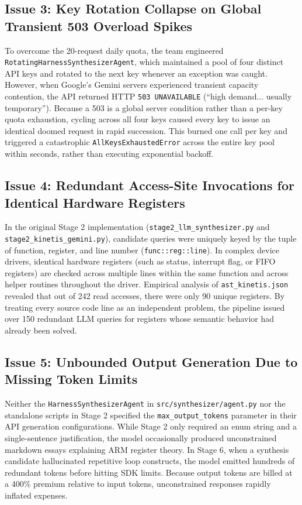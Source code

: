 \documentclass[11pt,a4paper]{article}
\begin{document}
\subsection{Issue 3: Key Rotation Collapse on Global Transient 503 Overload Spikes}
To overcome the 20-request daily quota, the team engineered \texttt{RotatingHarnessSynthesizerAgent}, which maintained a pool of four distinct API keys and rotated to the next key whenever an exception was caught. However, when Google's Gemini servers experienced transient capacity contention, the API returned HTTP \texttt{503 UNAVAILABLE} (``high demand... usually temporary''). Because a 503 is a global server condition rather than a per-key quota exhaustion, cycling across all four keys caused every key to issue an identical doomed request in rapid succession. This burned one call per key and triggered a catastrophic \texttt{AllKeysExhaustedError} across the entire key pool within seconds, rather than executing exponential backoff.

\subsection{Issue 4: Redundant Access-Site Invocations for Identical Hardware Registers}
In the original Stage 2 implementation (\texttt{stage2\_llm\_synthesizer.py} and \texttt{stage2\_kinetis\_gemini.py}), candidate queries were uniquely keyed by the tuple of function, register, and line number (\texttt{func::reg::line}). In complex device drivers, identical hardware registers (such as status, interrupt flag, or FIFO registers) are checked across multiple lines within the same function and across helper routines throughout the driver. Empirical analysis of \texttt{ast\_kinetis.json} revealed that out of 242 read accesses, there were only 90 unique registers. By treating every source code line as an independent problem, the pipeline issued over 150 redundant LLM queries for registers whose semantic behavior had already been solved.

\subsection{Issue 5: Unbounded Output Generation Due to Missing Token Limits}
Neither the \texttt{HarnessSynthesizerAgent} in \texttt{src/synthesizer/agent.py} nor the standalone scripts in Stage 2 specified the \texttt{max\_output\_tokens} parameter in their API generation configurations. While Stage 2 only required an enum string and a single-sentence justification, the model occasionally produced unconstrained markdown essays explaining ARM register theory. In Stage 6, when a synthesis candidate hallucinated repetitive loop constructs, the model emitted hundreds of redundant tokens before hitting SDK limits. Because output tokens are billed at a 400\% premium relative to input tokens, unconstrained responses rapidly inflated expenses.
\end{document}
